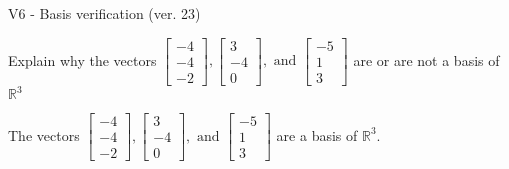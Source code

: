 \begin{exercise}
  \begin{exerciseTitle}V6 - Basis verification (ver. 23)\end{exerciseTitle}
  \begin{exerciseStatement}
    Explain why the vectors \(\left[\begin{array}{r}
-4 \\
-4 \\
-2
\end{array}\right] , \left[\begin{array}{r}
3 \\
-4 \\
0
\end{array}\right] , \text{ and } \left[\begin{array}{r}
-5 \\
1 \\
3
\end{array}\right]\) are or are not a basis of \(\mathbb{R}^3\)	


  \end{exerciseStatement}
  \begin{exerciseAnswer}
   The vectors \(\left[\begin{array}{r}
-4 \\
-4 \\
-2
\end{array}\right] , \left[\begin{array}{r}
3 \\
-4 \\
0
\end{array}\right] , \text{ and } \left[\begin{array}{r}
-5 \\
1 \\
3
\end{array}\right]\) 
  	 are  a basis of \(\mathbb{R}^3\).
  


  \end{exerciseAnswer}
\end{exercise}
